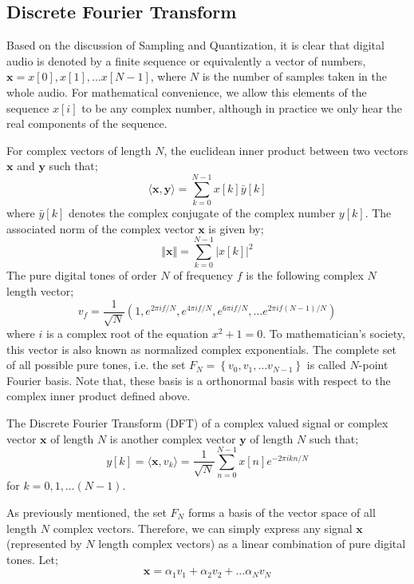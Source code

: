 \documentclass[10pt]{article}
\begin{document}
\subsection{Discrete Fourier Transform}
\qquad Based on the discussion of Sampling and Quantization, it is clear that digital audio is denoted by a finite sequence or equivalently a vector of numbers, $\textbf{x} = x[0], x[1], \dots x[N-1]$, where $N$ is the number of samples taken in the whole audio. For mathematical convenience, we allow this elements of the sequence $x[i]$ to be any complex number, although in practice we only hear the real components of the sequence.

For complex vectors of length $N$, the euclidean inner product between two vectors $\textbf{x}$ and $\textbf{y}$ such that;
    $$\langle \textbf{x},\textbf{y} \rangle = \sum_{k=0}^{N-1} x[k]\bar{y}[k]$$
    where $\bar{y}[k]$ denotes the complex conjugate of the complex number $y[k]$.
The associated norm of the complex vector $\textbf{x}$ is given by;
    $$\Vert \textbf{x}\Vert = \sum_{k=0}^{N-1} \vert x[k]\vert ^2$$
The pure digital tones of order $N$ of frequency $f$ is the following complex $N$ length vector;
$$v_{f} = \dfrac{1}{\sqrt{N}}\left(1, e^{2\pi i f/N}, e^{4\pi i f/N}, e^{6\pi i f/N}, \dots e^{2\pi i f(N-1)/N}\right)$$
where $i$ is a complex root of the equation $x^2 + 1 = 0$. To mathematician's society, this vector is also known as normalized complex exponentials.
The complete set of all possible pure tones, i.e. the set  $F_N = \left\{v_0, v_1, \dots v_{N-1}\right\}$ is called $N$-point Fourier basis. Note that, these basis is a orthonormal basis with respect to the complex inner product defined above.

The Discrete Fourier Transform (DFT) of a complex valued signal or complex vector $\textbf{x}$ of length $N$ is another complex vector $\textbf{y}$ of length $N$ such that;
$$y[k] = \langle \textbf{x}, v_k \rangle = \dfrac{1}{\sqrt{N}}\sum_{n=0}^{N-1} x[n] e^{-2\pi i kn/N}$$
for $k = 0, 1, \dots (N-1)$.
    
As previously mentioned, the set $F_N$ forms a basis of the vector space of all length $N$ complex vectors. Therefore, we can simply express any signal $\textbf{x}$ (represented by $N$ length complex vectors) as a linear combination of pure digital tones. Let;
$$\textbf{x} = \alpha_1 v_1 + \alpha_2 v_2 + \dots \alpha_Nv_N$$
\end{document}
